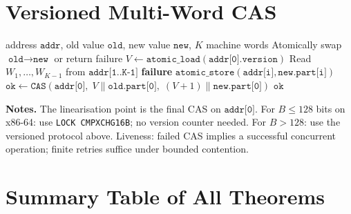 \documentclass[11pt,a4paper]{article}
\theoremstyle{definition}
\theoremstyle{plain}
\theoremstyle{remark}
\begin{document}
\section{Versioned Multi-Word CAS}
\label{app:mwcas}

\begin{algorithm}[H]
\caption{Versioned Multi-Word CAS for Wide L-Words}
\label{alg:mwcas}
\begin{algorithmic}[1]
\REQUIRE address $\texttt{addr}$, old value $\texttt{old}$,
         new value $\texttt{new}$, $K$ machine words
\ENSURE Atomically swap $\texttt{old}\to\texttt{new}$ or return failure
\STATE $V \leftarrow \texttt{atomic\_load}(\texttt{addr[0].version})$
\STATE Read $W_1,\ldots,W_{K-1}$ from $\texttt{addr[1..K-1]}$
  \RETURN \textbf{failure}
\ENDIF
{}
  \STATE $\texttt{atomic\_store}(\texttt{addr[i]}, \texttt{new.part[i]})$
\ENDFOR
\STATE $\texttt{ok} \leftarrow \texttt{CAS}(\texttt{addr[0]},\;
       V\mathbin\|{\texttt{old.part[0]}},\;
       (V{+}1)\mathbin\|{\texttt{new.part[0]}})$
\RETURN $\texttt{ok}$
\end{algorithmic}
\end{algorithm}

\textbf{Notes.}
The linearisation point is the final CAS on $\texttt{addr[0]}$.
For $B \le 128$ bits on x86-64: use \texttt{LOCK CMPXCHG16B}; no
version counter needed.
For $B > 128$: use the versioned protocol above.
Liveness: failed CAS implies a successful concurrent operation; finite
retries suffice under bounded contention.

\section{Summary Table of All Theorems}
\label{app:summary}
\end{document}
